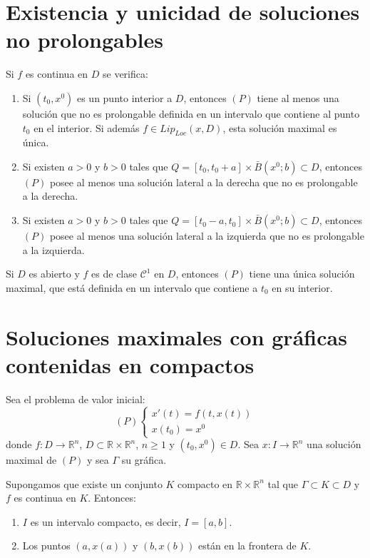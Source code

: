 \section{Existencia y unicidad de soluciones no prolongables}
\begin{theorem}
    Si $f$ es continua en $D$ se verifica:
    \begin{enumerate}
        \item Si $(t_0, x^0)$ es un punto interior a $D$, entonces $(P)$ tiene al menos una solución que no es prolongable definida en un intervalo que contiene al punto $t_0$ en el interior.
              Si además $f \in Lip_{Loc}(x, D)$, esta solución maximal es única.
        \item Si existen $a > 0$ y $b > 0$ tales que $Q = [t_0, t_0 + a] \times \bar{B}(x^0; b) \subset D$, entonces $(P)$ posee al menos una solución lateral a la derecha que no es prolongable a la derecha.
        \item Si existen $a > 0$ y $b > 0$ tales que $Q = [t_0 - a, t_0] \times \bar{B}(x^0; b) \subset D$, entonces $(P)$ posee al menos una solución lateral a la izquierda que no es prolongable a la izquierda.
    \end{enumerate}
\end{theorem}

\begin{remark}
    Si $D$ es abierto y $f$ es de clase $\mathcal{C}^1$ en $D$, entonces $(P)$ tiene una única solución maximal, que está definida en un intervalo que contiene a $t_0$ en su interior.
\end{remark}

\section{Soluciones maximales con gráficas contenidas en compactos}
\begin{theorem}
    Sea el problema de valor inicial:
    $$(P) \begin{cases}
            x'(t) = f(t, x(t)) \\
            x(t_0) = x^0
        \end{cases}$$
    donde $f: D \to \mathbb{R}^n$, $D \subset \mathbb{R} \times \mathbb{R}^n$, $n \geq 1$ y $(t_0, x^0) \in D$.
    Sea $x: I \to \mathbb{R}^n$ una solución maximal de $(P)$ y sea $\Gamma$ su gráfica.

    Supongamos que existe un conjunto $K$ compacto en $\mathbb{R} \times \mathbb{R}^n$ tal que $\Gamma \subset K \subset D$ y $f$ es continua en $K$.
    Entonces:
    \begin{enumerate}
        \item $I$ es un intervalo compacto, es decir, $I = [a, b]$.
        \item Los puntos $(a, x(a))$ y $(b, x(b))$ están en la frontera de $K$.
    \end{enumerate}
\end{theorem}

